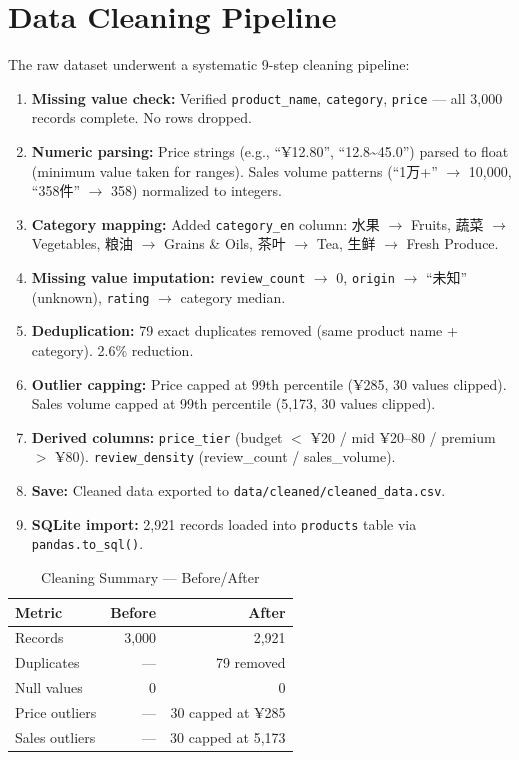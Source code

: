 \documentclass[12pt,a4paper]{report}
\begin{document}
\section{Data Cleaning Pipeline}

The raw dataset underwent a systematic 9-step cleaning pipeline:

\begin{enumerate}[itemsep=3pt]
  \item \textbf{Missing value check:} Verified \texttt{product\_name}, \texttt{category}, \texttt{price} --- all 3,000 records complete. No rows dropped.
  \item \textbf{Numeric parsing:} Price strings (e.g., ``¥12.80'', ``12.8\textasciitilde45.0'') parsed to float (minimum value taken for ranges). Sales volume patterns (``1万+'' $\rightarrow$ 10,000, ``358件'' $\rightarrow$ 358) normalized to integers.
  \item \textbf{Category mapping:} Added \texttt{category\_en} column: 水果 $\rightarrow$ Fruits, 蔬菜 $\rightarrow$ Vegetables, 粮油 $\rightarrow$ Grains \& Oils, 茶叶 $\rightarrow$ Tea, 生鲜 $\rightarrow$ Fresh Produce.
  \item \textbf{Missing value imputation:} \texttt{review\_count} $\rightarrow$ 0, \texttt{origin} $\rightarrow$ ``未知'' (unknown), \texttt{rating} $\rightarrow$ category median.
  \item \textbf{Deduplication:} 79 exact duplicates removed (same product name + category). 2.6\% reduction.
  \item \textbf{Outlier capping:} Price capped at 99th percentile (¥285, 30 values clipped). Sales volume capped at 99th percentile (5,173, 30 values clipped).
  \item \textbf{Derived columns:} \texttt{price\_tier} (budget $<$ ¥20 / mid ¥20--80 / premium $>$ ¥80). \texttt{review\_density} (review\_count / sales\_volume).
  \item \textbf{Save:} Cleaned data exported to \texttt{data/cleaned/cleaned\_data.csv}.
  \item \textbf{SQLite import:} 2,921 records loaded into \texttt{products} table via \texttt{pandas.to\_sql()}.
\end{enumerate}

\begin{table}[H]
  \centering
  \caption{Cleaning Summary --- Before/After}
  \begin{tabular}{@{}lrr@{}}
    \toprule
    \textbf{Metric} & \textbf{Before} & \textbf{After} \\
    \midrule
    Records          & 3,000 & 2,921 \\
    Duplicates       & ---   & 79 removed \\
    Null values      & 0     & 0 \\
    Price outliers   & ---   & 30 capped at ¥285 \\
    Sales outliers   & ---   & 30 capped at 5,173 \\
    \bottomrule
  \end{tabular}
\end{table}
\end{document}
